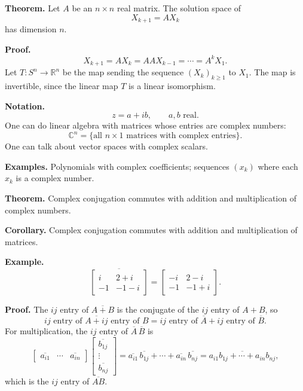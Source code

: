 \documentclass[letterpaper]{article}
\begin{document}
\textbf{Theorem.} Let $A$ be an $n\times n$ real matrix. The solution space of
\[
X_{k+1}=AX_k
\]
has dimension $n$.

\textbf{Proof.}
\[
X_{k+1}=AX_k=AAX_{k-1}=\cdots=A^kX_1.
\]
Let $T:S^n\to\mathbb{R}^n$ be the map sending the sequence $(X_k)_{k\geq1}$ to $X_1$. The map is invertible, since the linear map $T$ is a linear isomorphism.

\newpage

\textbf{Notation.}
\[
z=a+ib,\qquad a,b\text{ real}.
\]
One can do linear algebra with matrices whose entries are complex numbers:
\[
\mathbb{C}^n=\{\text{all }n\times1\text{ matrices with complex entries}\}.
\]
One can talk about vector spaces with complex scalars.

\textbf{Examples.} Polynomials with complex coefficients; sequences $(x_k)$ where each $x_k$ is a complex number.

\bigskip

\textbf{Theorem.} Complex conjugation commutes with addition and multiplication of complex numbers.

\textbf{Corollary.} Complex conjugation commutes with addition and multiplication of matrices.

\textbf{Example.}
\[
\overline{\begin{bmatrix}i&2+i\\-1&-1-i\end{bmatrix}}
=\begin{bmatrix}-i&2-i\\-1&-1+i\end{bmatrix}.
\]

\textbf{Proof.} The $ij$ entry of $\overline{A+B}$ is the conjugate of the $ij$ entry of $A+B$, so
\[
\overline{\text{$ij$ entry of }A+\text{$ij$ entry of }B}
=\text{$ij$ entry of }\overline{A}+\text{$ij$ entry of }\overline{B}.
\]
For multiplication, the $ij$ entry of $\overline{A}\,\overline{B}$ is
\[
\begin{bmatrix}\overline{a_{i1}}&\cdots&\overline{a_{in}}\end{bmatrix}
\begin{bmatrix}\overline{b_{1j}}\\\vdots\\\overline{b_{nj}}\end{bmatrix}
=\overline{a_{i1}}\,\overline{b_{1j}}+\cdots+\overline{a_{in}}\,\overline{b_{nj}}
=\overline{a_{i1}b_{1j}+\cdots+a_{in}b_{nj}},
\]
which is the $ij$ entry of $\overline{AB}$.

\newpage
\end{document}
